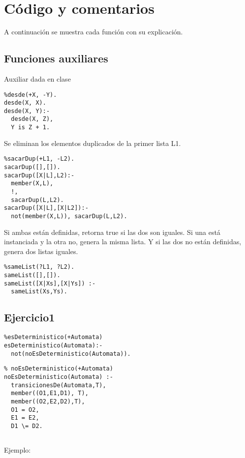 \documentclass[10pt, a4paper,english,spanish,hidelinks]{article}
\begin{document}
\pagestyle{myheadings}
\maketitle
{}

\thispagestyle{empty}
\tableofcontents
\newpage
\section{Código y comentarios}
A continuación se muestra cada función con su explicación.

\subsection{Funciones auxiliares}

Auxiliar dada en clase
\begin{verbatim}
%desde(+X, -Y).
desde(X, X).
desde(X, Y):-
  desde(X, Z),
  Y is Z + 1.
\end{verbatim}


Se eliminan los elementos duplicados de la primer lista L1.
\begin{verbatim}
%sacarDup(+L1, -L2).
sacarDup([],[]).
sacarDup([X|L],L2):-
  member(X,L),
  !,
  sacarDup(L,L2).
sacarDup([X|L],[X|L2]):-
  not(member(X,L)), sacarDup(L,L2).
\end{verbatim}

Si ambas están definidas, retorna true si las dos son iguales.
Si una está instanciada y la otra no, genera la misma lista.
Y si las dos no están definidas, genera dos listas iguales.

\begin{verbatim}
%sameList(?L1, ?L2).
sameList([],[]).
sameList([X|Xs],[X|Ys]) :- 
  sameList(Xs,Ys).
\end{verbatim}

\subsection{Ejercicio1}

\begin{verbatim}
%esDeterministico(+Automata)
esDeterministico(Automata):-
  not(noEsDeterministico(Automata)).
\end{verbatim}

\begin{verbatim}
% noEsDeterministico(+Automata)
noEsDeterministico(Automata) :- 
  transicionesDe(Automata,T),
  member((O1,E1,D1), T),
  member((O2,E2,D2),T),
  O1 = O2,
  E1 = E2,
  D1 \= D2.


\end{verbatim}
Ejemplo:
\end{document}
